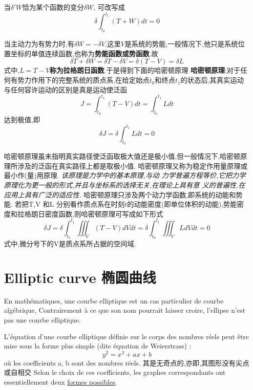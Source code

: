 \documentclass{book}
\begin{document}
当$\delta 'W$恰为某个函数的变分$\delta W$, \lasteq 可改写成
\begin{equation}
 \delta \int_{t_0}^{t_1}(T+W)dt=0
\end{equation}

当主动力为有势力时,有$\delta W=-\delta V$,这里$V$是系统的势能,一般情况下,他只是系统位置坐标的单值连续函数,也称为\textbf{势能函数或势函数}.故
\begin{equation}
 \delta T + \delta W =\delta T -\delta V =\delta (T-V)=\delta L
\end{equation}
式中,\textbf{$L=T-V$称为拉格朗日函数}.于是得到下面的哈密顿原理
\textbf{哈密顿原理}:对于任何有势力作用下的完整系统的质点系,在给定始点$t_0$和终点$t_1$的状态后,其真实运动与任何容许运动的区别是真是运动使泛函
\begin{equation}
 J=\int_{t_0}^{t_1}(T-V)dt=\int_{t_0}^{t_1}Ldt
\end{equation}
达到极值,即
\begin{equation}
 \delta J=\delta \int_{t_0}^{t_1}Ldt=0
\end{equation}

哈密顿原理虽未指明真实路径使泛函取极大值还是极小值,但一般情况下,哈密顿原理所涉及的泛函在真实路径上都是取极小值.
哈密顿原理又称为稳定作用量原理或最小作(量)用原理.
\emph{该原理是力学中的基本原理,与动 力学普遍方程等价,它把力学原理化为更一般的形式,并且与坐标系的选择无关,在理论上具有意 义的普遍性,在应用上具有广泛的适应性.}
哈密顿原理只涉及两个动力学函数,即系统的动能和势能. 
若把T,V 和L 分别看作质点系在时刻$t$的动能密度(即单位体积的动能),势能密度和拉格朗日密度函数,则哈密顿原理可写成如下形式
\begin{equation}
 \delta J=\delta \int_{t_0}^{t_1} \iiint_V (T-V)dVdt=\delta \int_{t_0}^{t_1} \iiint_V LdVdt =0
\end{equation}
式中,微分号下的V是质点系所占据的空间域.

\chapter{Elliptic curve 椭圆曲线}
En mathématiques, une courbe elliptique est un cas particulier de courbe algébrique,
Contrairement à ce que son nom pourrait laisser croire, l'ellipse n'est pas une courbe elliptique.

L'équation d'une courbe elliptique définie sur le corps des nombres réels peut être mise sous la forme plus simple (dite équation de Weierstrass) :
$$ y^2 = x^3 + ax + b $$
où les coefficients a, b sont des nombres réels.
其是无奇点的,亦即,其图形没有尖点或自相交
Selon le choix de ces coefficients, les graphes correspondants ont essentiellement deux
\href{http://upload.wikimedia.org/wikipedia/commons/d/d0/ECClines-3.svg}{formes possibles}.
\end{document}
